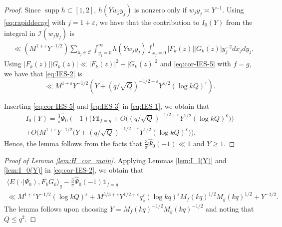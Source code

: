 \documentclass[12pt,reqno]{amsart}
\theoremstyle{remark}
\DeclareMathOperator{\supp}{supp}
\numberwithin{equation}{section}
\begin{document}
\begin{proof}
Since $\supp h \subset [1,2]$,  $h(Yw_jy_j)$ is nonzero only if $w_jy_j \asymp Y^{-1}$. Using \eqref{eq:rapiddecay} with $j = 1 +\varepsilon$, we have that the contribution to $I_0(Y)$ from the integral in $\mathscr{I}(w_jy_j)$ is
\begin{equation}
\label{eq:IES-2}
    \begin{aligned}
        &\ll (M^{1+\varepsilon}Y^{-1/2})\sum_{\mathfrak{a}_j \in \mathcal{C}} \int_{y_j=0}^{\infty} h(Yw_jy_j)\int_{x_j =0}^1
        |F_k(z)||G_k(z)|  y_j^{-2}dx_jdy_j.
    \end{aligned}
\end{equation}
Using $|F_k(z)||G_k(z)| \ll |F_k(z)|^2+ |G_k(z)|^2$ and \eqref{eq:cor-IES-5} with $f=g$,
we have that \eqref{eq:IES-2} is 
\begin{equation}
\label{eq:IES-3}
   \ll M^{1+\varepsilon}Y^{-1/2}( Y + (q/\sqrt{Q})^{-1/2+\varepsilon}Y^{1/2}(\log kQ)^{\varepsilon}).
\end{equation}

Inserting \eqref{eq:cor-IES-5} and \eqref{eq:IES-3} in \eqref{eq:IES-1}, we obtain that 
\begin{multline*}
				I_0(Y) = \frac{3}{\pi}\widehat{\Psi}_0(-1)\big(Y\mathds{1}_{f=g}+ O\big((q/\sqrt{Q})^{-1/2+\varepsilon}Y^{1/2}(\log kQ)^{\varepsilon}\big)\big)\\
			  + O\big(M^{1+\varepsilon}Y^{-1/2} \big(Y+ (q/\sqrt{Q})^{-1/2+\varepsilon}Y^{1/2}(\log kQ)^{\varepsilon}\big)\big).
		\end{multline*}
            Hence, the lemma follows from the facts that $\frac{3}{\pi}\widehat{\Psi}_0(-1) \ll 1$ and $Y \ge 1$. 
            \end{proof}


        \begin{proof}[Proof of Lemma \ref{lem:H_cor_main}]
		Applying Lemmas \ref{lem:I_l(Y)} and \ref{lem:I_0(Y)} in \eqref{eq:cor-IES-2}, we obtain that
		\begin{multline*}
				\langle E(\cdot|\Psi_0), \overline{F_k}G_k\rangle_q - \frac{3}{\pi}\widehat{\Psi}_0(-1)\mathds{1}_{f=g}\\
                \ll M^{1+\varepsilon}Y^{-1/2}(\log kQ)^\varepsilon + M^{5/3+\varepsilon}Y^{1/2+\varepsilon}q_\diamond^\varepsilon  (\log kq)^\varepsilon M_f(kq)^{1/2}M_g(kq)^{1/2}+Y^{-1/2}.
		\end{multline*}
	   The lemma follows upon choosing $Y = M_f(kq)^{-1/2}M_g(kq)^{-1/2}$ and noting that $Q \le q^2$.
        \end{proof}
 
\end{document}
